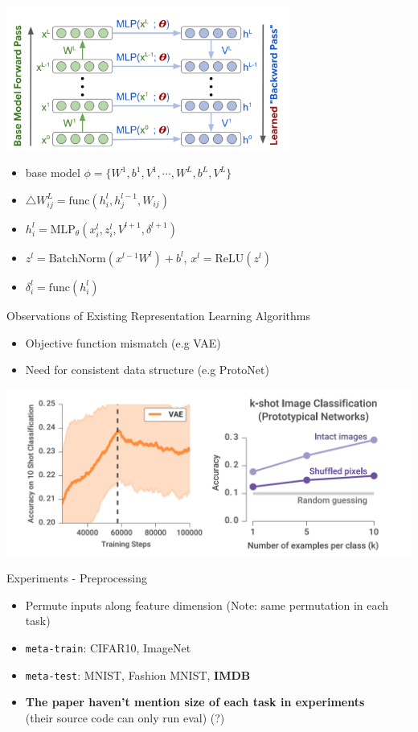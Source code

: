 \documentclass{beamer}
\begin{document}
\begin{frame}
  \center \includegraphics[width=0.7\textwidth]{fig/update-rule.png}
  \begin{itemize}
    \item base model $\phi = \lbrace W^1,b^1,V^1,\cdots,W^L,b^L,V^L \rbrace$
    \item $\triangle W_{ij}^L = \text{func}(h_i^l,h_j^{l-1}, W_{ij})$
    \item $h_i^l = \text{MLP}_\theta(x^l_i,z_i^l,V^{l+1},\delta^{l+1})$
    \item $z^l = \text{BatchNorm}(x^{l-1}W^l) + b^l$, $x^l = \text{ReLU}(z^l)$
    \item $\delta_i^l = \text{func}(h_i^l)$
  \end{itemize}
\end{frame}

\begin{frame}{Observations of Existing Representation Learning Algorithms}
  \begin{itemize}
    \item Objective function mismatch (e.g VAE)
    \item Need for consistent data structure (e.g ProtoNet)
  \end{itemize}
  \center \includegraphics[width=\textwidth]{fig/obs.png}

\end{frame}

\begin{frame}{Experiments - Preprocessing}
  \begin{itemize}
    \item Permute inputs along feature dimension (Note: same permutation in each task)
    \item \texttt{meta-train}: CIFAR10, ImageNet
    \item \texttt{meta-test}: MNIST, Fashion MNIST, \textbf{IMDB}
  \item \textbf{The paper haven't mention size of each task in experiments} \\
    (their source code can only run eval) (?)
  \end{itemize}
\end{frame}
\end{document}
